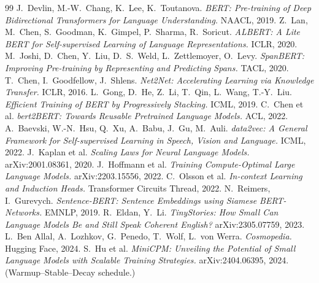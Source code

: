 \documentclass[11pt,a4paper]{article}
\begin{document}
\begin{thebibliography}{99}\small
{} J.\ Devlin, M.-W.\ Chang, K.\ Lee, K.\ Toutanova.
\emph{BERT: Pre-training of Deep Bidirectional Transformers for Language Understanding.}
NAACL, 2019.
 Z.\ Lan, M.\ Chen, S.\ Goodman, K.\ Gimpel, P.\ Sharma, R.\ Soricut.
\emph{ALBERT: A Lite BERT for Self-supervised Learning of Language Representations.}
ICLR, 2020.
 M.\ Joshi, D.\ Chen, Y.\ Liu, D.\ S.\ Weld, L.\ Zettlemoyer, O.\ Levy.
\emph{SpanBERT: Improving Pre-training by Representing and Predicting Spans.} TACL, 2020.
 T.\ Chen, I.\ Goodfellow, J.\ Shlens.
\emph{Net2Net: Accelerating Learning via Knowledge Transfer.} ICLR, 2016.
 L.\ Gong, D.\ He, Z.\ Li, T.\ Qin, L.\ Wang, T.-Y.\ Liu.
\emph{Efficient Training of BERT by Progressively Stacking.} ICML, 2019.
 C.\ Chen et al.
\emph{bert2BERT: Towards Reusable Pretrained Language Models.} ACL, 2022.
 A.\ Baevski, W.-N.\ Hsu, Q.\ Xu, A.\ Babu, J.\ Gu, M.\ Auli.
\emph{data2vec: A General Framework for Self-supervised Learning in Speech, Vision and
Language.} ICML, 2022.
 J.\ Kaplan et al. \emph{Scaling Laws for Neural Language Models.}
arXiv:2001.08361, 2020.
 J.\ Hoffmann et al.
\emph{Training Compute-Optimal Large Language Models.} arXiv:2203.15556, 2022.
 C.\ Olsson et al.
\emph{In-context Learning and Induction Heads.} Transformer Circuits Thread, 2022.
 N.\ Reimers, I.\ Gurevych.
\emph{Sentence-BERT: Sentence Embeddings using Siamese BERT-Networks.} EMNLP, 2019.
 R.\ Eldan, Y.\ Li.
\emph{TinyStories: How Small Can Language Models Be and Still Speak Coherent English?}
arXiv:2305.07759, 2023.
 L.\ Ben Allal, A.\ Lozhkov, G.\ Penedo, T.\ Wolf, L.\ von Werra.
\emph{Cosmopedia.} Hugging Face, 2024.
 S.\ Hu et al.
\emph{MiniCPM: Unveiling the Potential of Small Language Models with Scalable Training
Strategies.} arXiv:2404.06395, 2024. (Warmup--Stable--Decay schedule.)
\end{thebibliography}
\end{document}
